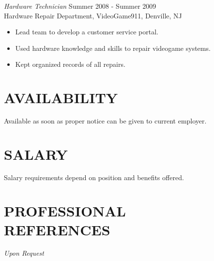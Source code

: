 \documentclass[line,margin]{res}
\begin{document}
\begin{resume}
	{\sl Hardware Technician} \hfill            Summer 2008 - Summer 2009 \\
	Hardware Repair Department, VideoGame911, Denville, NJ
	\begin{itemize}  \itemsep -2pt
		\item Lead team to develop a customer service portal. 
		\item Used hardware knowledge and skills to repair videogame systems. 
		\item Kept organized records of all repairs. 
	\end{itemize} 

\section{AVAILABILITY}
	Available as soon as proper notice can be given to current employer.

\section {SALARY}
	Salary requirements depend on position and benefits offered.

\section{PROFESSIONAL \\ REFERENCES}
	{\sl Upon Request}

\end{resume}
\end{document}
